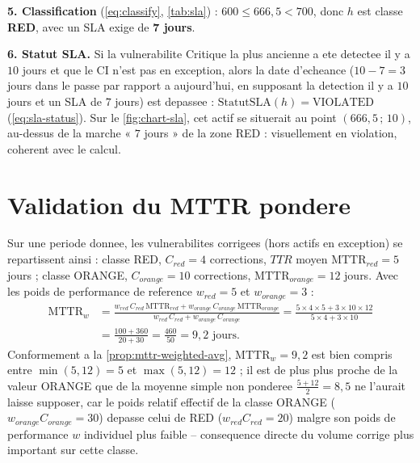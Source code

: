 \begin{exemple}
\smallskip
\noindent\textbf{5. Classification} (\cref{eq:classify}, \cref{tab:sla}) :
$600\le 666{,}5<700$, donc $h$ est classe \textbf{RED}, avec un SLA exige de
\textbf{7 jours}.

\smallskip
\noindent\textbf{6. Statut SLA.} Si la vulnerabilite Critique la plus ancienne a ete
detectee il y a $10$ jours et que le CI n'est pas en exception, alors la date
d'echeance ($10-7=3$ jours dans le passe par rapport a aujourd'hui, en supposant la
detection il y a $10$ jours et un SLA de $7$ jours) est depassee :
$\mathrm{StatutSLA}(h) = \text{VIOLATED}$ (\cref{eq:sla-status}). Sur le
\cref{fig:chart-sla}, cet actif se situerait au point $(666{,}5\,;\,10)$, au-dessus
de la marche « $7$ jours » de la zone RED : visuellement en violation, coherent avec
le calcul.
\end{exemple}

\section{Validation du MTTR pondere}

\begin{exemple}
Sur une periode donnee, les vulnerabilites corrigees (hors actifs en exception) se
repartissent ainsi : classe RED, $C_{red}=4$ corrections, $TTR$ moyen
$\mathrm{MTTR}_{red}=5$ jours ; classe ORANGE, $C_{orange}=10$ corrections,
$\mathrm{MTTR}_{orange}=12$ jours. Avec les poids de performance de reference
$w_{red}=5$ et $w_{orange}=3$ :
\begin{align*}
\mathrm{MTTR}_w &= \frac{w_{red}\,C_{red}\,\mathrm{MTTR}_{red} + w_{orange}\,C_{orange}\,\mathrm{MTTR}_{orange}}
                       {w_{red}\,C_{red} + w_{orange}\,C_{orange}}
= \frac{5\times4\times5 + 3\times10\times12}{5\times4+3\times10} \\
&= \frac{100+360}{20+30} = \frac{460}{50} = 9{,}2 \text{ jours}.
\end{align*}
Conformement a la \cref{prop:mttr-weighted-avg}, $\mathrm{MTTR}_w=9{,}2$ est bien
compris entre $\min(5,12)=5$ et $\max(5,12)=12$ ; il est de plus plus proche de la
valeur ORANGE que de la moyenne simple non ponderee
$\tfrac{5+12}{2}=8{,}5$ ne l'aurait laisse supposer, car le poids relatif effectif
de la classe ORANGE ($w_{orange}C_{orange}=30$) depasse celui de RED
($w_{red}C_{red}=20$) malgre son poids de performance $w$ individuel plus faible --
consequence directe du volume corrige plus important sur cette classe.
\end{exemple}

